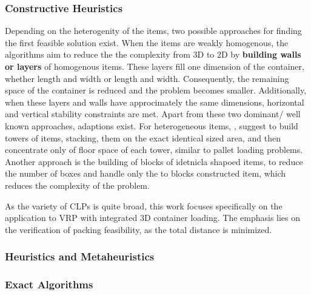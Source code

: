\subsubsection{Constructive Heuristics}
Depending on the heterogenity of the items, two possible approaches for finding the first
feasible solution exist. When the items are weakly homogenous, the algorithms aim to reduce
the the complexity from \gls{3D} to \gls{2D} by \textbf{building walls or layers} of homogenous items.
These layers fill one dimension of the container, whether length and width or length and width.
Consequently, the remaining space of the container is reduced and the problem becomes smaller.
Additionally, when these layers and walls have approcimately the same dimensions, horizontal
and vertical stability constraints are met. Apart from these two dominant/ well known approaches,
adaptions exist. For heterogeneous items, \citeauthor{gehring1997genetic},
suggest to build towers of items, stacking, them on the exact identical sized area, and then
concentrate only of floor space of each tower, similar to pallet loading problems. Another approach
is the building of blocks of idetnicla shapoed items, to reduce the number of boxes and handle
only the to blocks constructed item, which reduces the complexity of the problem.

As the variety of \gls{CLP}s is quite broad, this work focuses specifically on
the application to \gls{VRP} with integrated \gls{3D} container loading. The emphasis lies
on the verification of packing feasibility, as the total distance is minimized.

\subsubsection{Heuristics and Metaheuristics}
\subsubsection{Exact Algorithms}